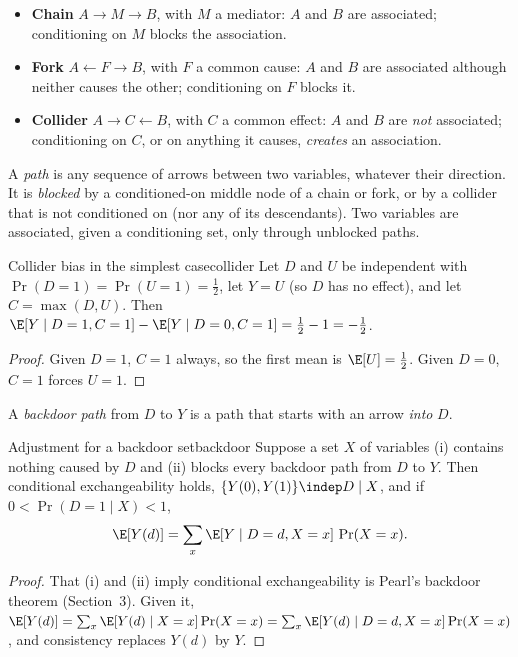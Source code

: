 \documentclass[11pt]{article}
\begin{document}
\begin{itemize}
  \item \textbf{Chain} $A \to M \to B$, with $M$ a mediator: $A$ and $B$ are associated; conditioning on $M$
  blocks the association.
  \item \textbf{Fork} $A \leftarrow F \to B$, with $F$ a common cause: $A$ and $B$ are associated although
  neither causes the other; conditioning on $F$ blocks it.
  \item \textbf{Collider} $A \to C \leftarrow B$, with $C$ a common effect: $A$ and $B$ are \emph{not}
  associated; conditioning on $C$, or on anything it causes, \emph{creates} an association.
\end{itemize}

A \emph{path} is any sequence of arrows between two variables, whatever their direction. It is
\emph{blocked} by a conditioned-on middle node of a chain or fork, or by a collider that is not conditioned
on (nor any of its descendants). Two variables are associated, given a conditioning set, only through
unblocked paths.

\begin{prop}{Collider bias in the simplest case}{collider}
Let $D$ and $U$ be independent with $\Pr(D=1) = \Pr(U=1) = \tfrac12$, let $Y = U$ (so $D$ has no effect),
and let $C = \max(D, U)$. Then $\E[Y \mid D=1, C=1] - \E[Y \mid D=0, C=1] = \tfrac12 - 1 = -\tfrac12$.
\end{prop}
\begin{proof}
Given $D=1$, $C=1$ always, so the first mean is $\E[U] = \tfrac12$. Given $D=0$, $C=1$ forces $U=1$.
\end{proof}

A \emph{backdoor path} from $D$ to $Y$ is a path that starts with an arrow \emph{into} $D$.

\begin{prop}{Adjustment for a backdoor set}{backdoor}
Suppose a set $X$ of variables (i) contains nothing caused by $D$ and (ii) blocks every backdoor path from
$D$ to $Y$. Then conditional exchangeability holds, $\{Y(0), Y(1)\} \indep D \mid X$, and if
$0 < \Pr(D=1 \mid X) < 1$,
\[
  \E[Y(d)] = \sum_x \E[Y \mid D=d, X=x]\,\Pr(X=x) .
\]
\end{prop}
\begin{proof}
That (i) and (ii) imply conditional exchangeability is Pearl's backdoor theorem (Section~3). Given it,
$\E[Y(d)] = \sum_x \E[Y(d) \mid X=x]\Pr(X=x) = \sum_x \E[Y(d) \mid D=d, X=x]\Pr(X=x)$, and consistency
replaces $Y(d)$ by $Y$.
\end{proof}
\end{document}

